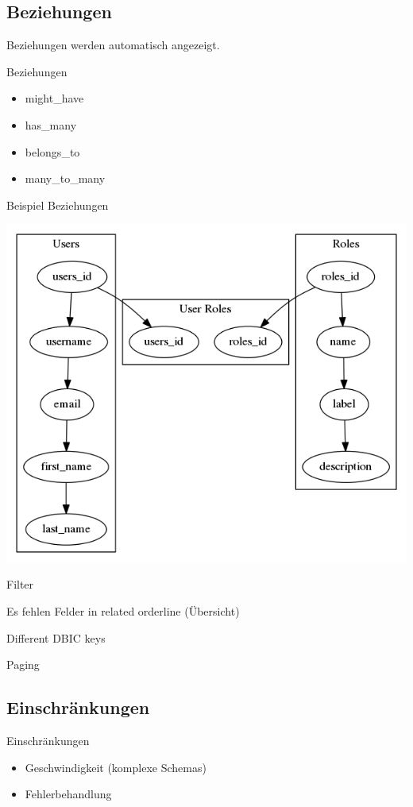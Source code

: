 \subsection{Beziehungen}

Beziehungen werden automatisch angezeigt.

\begin{frame}{Beziehungen}
\begin{itemize}
\item might\_have
\item has\_many
\item belongs\_to
\item many\_to\_many
\end{itemize}
\end{frame}

\begin{frame}{Beispiel Beziehungen}
  \begin{center}
    \includegraphics[width=\textwidth,height=0.8\textheight,keepaspectratio]{images/user-gv.png}
  \end{center}
\end{frame}

Filter

Es fehlen Felder in related orderline (Übersicht)

Different DBIC keys

Paging

\subsection{Einschränkungen}
\begin{frame}{Einschränkungen}
\begin{itemize}
\item Geschwindigkeit (komplexe Schemas)
\item Fehlerbehandlung
\end{itemize}
\end{frame}


